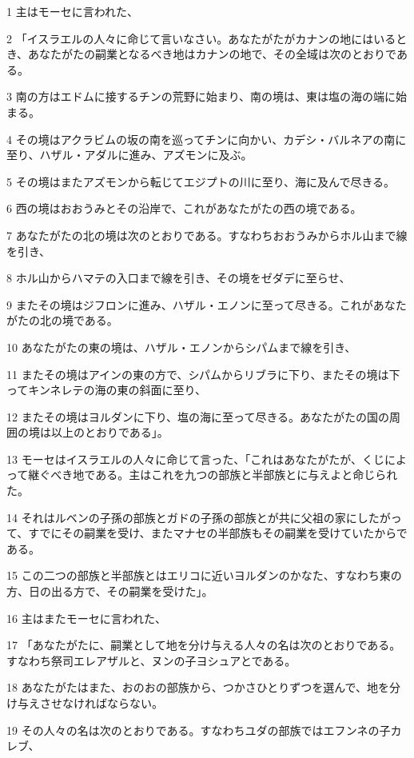 \par 1 主はモーセに言われた、
\par 2 「イスラエルの人々に命じて言いなさい。あなたがたがカナンの地にはいるとき、あなたがたの嗣業となるべき地はカナンの地で、その全域は次のとおりである。
\par 3 南の方はエドムに接するチンの荒野に始まり、南の境は、東は塩の海の端に始まる。
\par 4 その境はアクラビムの坂の南を巡ってチンに向かい、カデシ・バルネアの南に至り、ハザル・アダルに進み、アズモンに及ぶ。
\par 5 その境はまたアズモンから転じてエジプトの川に至り、海に及んで尽きる。
\par 6 西の境はおおうみとその沿岸で、これがあなたがたの西の境である。
\par 7 あなたがたの北の境は次のとおりである。すなわちおおうみからホル山まで線を引き、
\par 8 ホル山からハマテの入口まで線を引き、その境をゼダデに至らせ、
\par 9 またその境はジフロンに進み、ハザル・エノンに至って尽きる。これがあなたがたの北の境である。
\par 10 あなたがたの東の境は、ハザル・エノンからシパムまで線を引き、
\par 11 またその境はアインの東の方で、シパムからリブラに下り、またその境は下ってキンネレテの海の東の斜面に至り、
\par 12 またその境はヨルダンに下り、塩の海に至って尽きる。あなたがたの国の周囲の境は以上のとおりである」。
\par 13 モーセはイスラエルの人々に命じて言った、「これはあなたがたが、くじによって継ぐべき地である。主はこれを九つの部族と半部族とに与えよと命じられた。
\par 14 それはルベンの子孫の部族とガドの子孫の部族とが共に父祖の家にしたがって、すでにその嗣業を受け、またマナセの半部族もその嗣業を受けていたからである。
\par 15 この二つの部族と半部族とはエリコに近いヨルダンのかなた、すなわち東の方、日の出る方で、その嗣業を受けた」。
\par 16 主はまたモーセに言われた、
\par 17 「あなたがたに、嗣業として地を分け与える人々の名は次のとおりである。すなわち祭司エレアザルと、ヌンの子ヨシュアとである。
\par 18 あなたがたはまた、おのおの部族から、つかさひとりずつを選んで、地を分け与えさせなければならない。
\par 19 その人々の名は次のとおりである。すなわちユダの部族ではエフンネの子カレブ、
